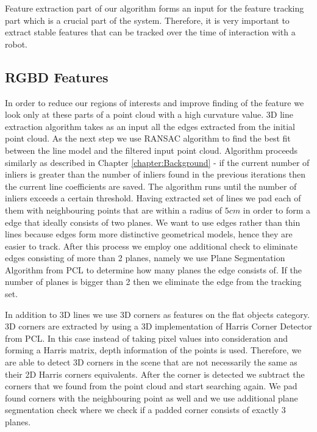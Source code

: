 Feature extraction part of our algorithm forms an input for the feature tracking part which is a crucial part of the system. Therefore, it is very important to extract stable features that can be tracked over the time of interaction with a robot.




\subsection{RGBD Features}
\label{sec:3dfeatures}
In order to reduce our regions of interests and improve finding of the feature we look only at these parts of a point cloud with a high curvature value. 3D line extraction algorithm takes as an input all the edges extracted from the initial point cloud. As the next step we use RANSAC algorithm to find the best fit between the line model and the filtered input point cloud. Algorithm proceeds similarly as described in Chapter \ref{chapter:Background} - if the current number of inliers is greater than the number of inliers found in the previous iterations then the current line coefficients are saved. The algorithm runs until the number of inliers exceeds a certain threshold. Having extracted set of lines we pad each of them with neighbouring points that are within a radius of $5cm$ in order to form a edge that ideally consists of two planes. We want to use edges rather than thin lines because edges form more distinctive geometrical models, hence they are easier to track. After this process we employ one additional check to eliminate edges consisting of more than 2 planes, namely we use Plane Segmentation Algorithm from PCL to determine how many planes the edge consists of. If the number of planes is bigger than 2 then we eliminate the edge from the tracking set.

In addition to 3D lines we use 3D corners as features on the flat objects category. 3D corners are extracted by using a 3D implementation of Harris Corner Detector from PCL. In this case instead of taking pixel values into consideration and forming a Harris matrix, depth information of the points is used. Therefore, we are able to detect 3D corners in the scene that are not necessarily the same as their 2D Harris corners equivalents. After the corner is detected we subtract the corners that we found from the point cloud and start searching again. We pad found corners with the neighbouring point as well and we use additional plane segmentation check where we check if a padded corner consists of exactly 3 planes.


